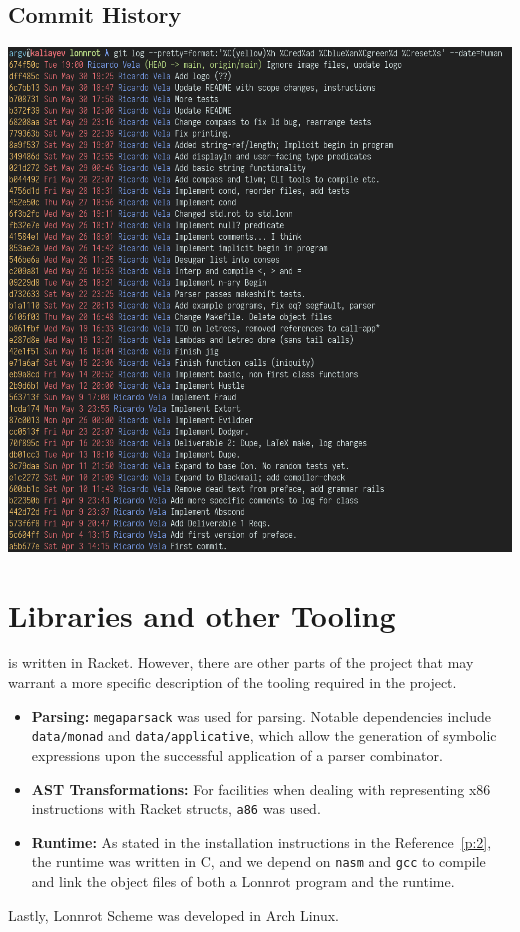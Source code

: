 \subsection*{Commit History}
\includegraphics[width=0.8\paperwidth]{figures/appendix/git-log}


\section*{Libraries and other Tooling}
 is written in Racket. However, there are other parts of
the project that may warrant a more specific description of the tooling required in the project.

\begin{itemize}
  \item \textbf{Parsing:} \texttt{megaparsack} was used for parsing. Notable dependencies include
        \texttt{data/monad} and \texttt{data/applicative}, which allow the generation of symbolic
        expressions upon the successful application of a parser combinator.
  \item \textbf{AST Transformations:} For facilities when dealing with representing x86 instructions
        with Racket structs, \texttt{a86} was used.
  \item \textbf{Runtime:} As stated in the installation instructions in the Reference~\ref{p:2}, the
        runtime was written in C, and we depend on \texttt{nasm} and \texttt{gcc} to compile and link
        the object files of both a Lonnrot program and the runtime.
\end{itemize}

Lastly, Lonnrot Scheme was developed in Arch Linux.
